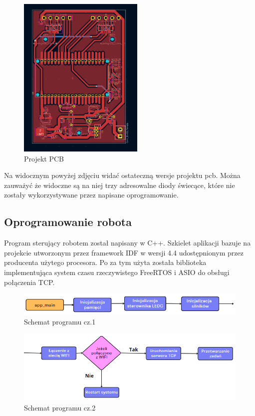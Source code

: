 \begin{figure}[H]
	\centering
	\includegraphics[width=6cm]{pages/robot/zdjecia/kicad/kiCad_PCB.png}
	\caption{Projekt PCB}
	\label{Fig:Rysunek}
\end{figure}
Na widocznym powyżej zdjęciu widać ostateczną wersje projektu pcb. 
Można zauważyć że widoczne są na niej trzy adresowalne diody świecące, które nie zostały wykorzystywane przez napisane oprogramowanie.


\subsection{Oprogramowanie robota}

Program sterujący robotem został napisany w C++. 
Szkielet aplikacji bazuje na projekcie utworzonym przez framework IDF w wersji 4.4 udostępnionym 
przez producenta użytego procesora. Po za tym użyta została biblioteka implementująca 
system czasu rzeczywistego FreeRTOS i ASIO do obsługi połączenia TCP. 
\begin{figure}[H]
	\centering
	\includegraphics[width=14cm]{pages/robot/zdjecia/schematy/softSchematCz1.png}
	\caption{Schemat programu cz.1 }
	\label{Fig:Rysunek}
\end{figure}
\begin{figure}[H]
	\centering
	\includegraphics[width=14cm]{pages/robot/zdjecia/schematy/softSchematCz2.png}
	\caption{Schemat programu cz.2}
	\label{Fig:Rysunek}
\end{figure}

